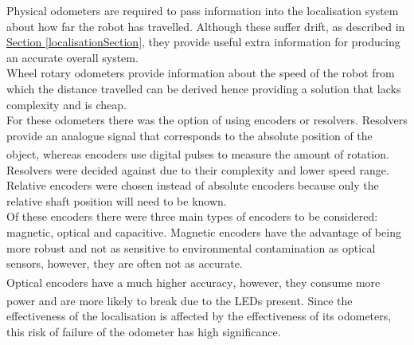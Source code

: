 \documentclass[11pt]{article}		%
\newcommand{\supercite}[1]{\textsuperscript{\cite{#1}}}		%
\newcommand{\sectref}[1]{\hyperref[#1]{Section \ref*{#1}}}     %
\begin{document}
         Physical odometers are required to pass information into the localisation system about how far the robot has travelled. Although these suffer drift, as described in \sectref{localisationSection}, they provide useful extra information for producing an accurate overall system.
            \\
            \hspace*{2ex}Wheel rotary odometers provide information about the speed of the robot from which the distance travelled can be derived hence providing a solution that lacks complexity and is cheap.%
            \\
            \hspace*{2ex}For these odometers there was the option of using encoders or resolvers. Resolvers provide an analogue signal that corresponds to the absolute position of the object, whereas encoders use digital pulses to measure the amount of rotation\supercite{Encoder_resolver}. Resolvers were decided against due to their complexity and lower speed range. Relative encoders were chosen instead of absolute encoders because only the relative shaft position will need to be known.
            \\
            \hspace*{2ex}Of these encoders there were three main types of encoders to be considered: magnetic, optical and capacitive. Magnetic encoders have the advantage of being more robust and not as sensitive to environmental contamination as optical sensors, however, they are often not as accurate. %
            \\
            \hspace*{2ex}Optical encoders have a much higher accuracy\supercite{Encoders}, however, they consume more power and are more likely to break due to the LEDs present\supercite{Encoders}. Since the effectiveness of the localisation is affected by the effectiveness of its odometers, this risk of failure of the odometer has high significance. 
\end{document}

